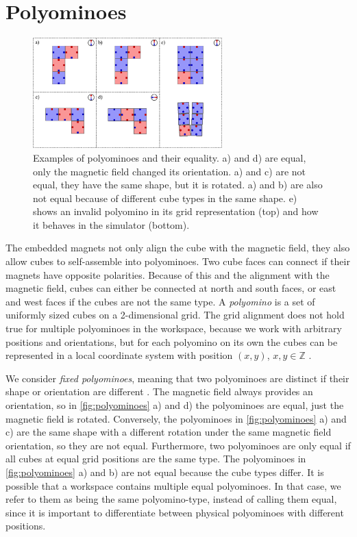 \section{Polyominoes}
\label{sec:polys}

\begin{figure}
	\centering
	\includegraphics[width=0.65\textwidth]{figures/polyominoes.pdf}
	\caption[Examples of polyominoes and their equality]{Examples of polyominoes and their equality. a) and d) are equal, only the magnetic field changed its orientation. a) and c) are not equal, they have the same shape, but it is rotated. a) and b) are also not equal because of different cube types in the same shape. e) shows an invalid polyomino in its grid representation (top) and how it behaves in the simulator (bottom).}
	\label{fig:polyominoes}
\end{figure}

The embedded magnets not only align the cube with the magnetic field, they also allow cubes to self-assemble into polyominoes.
Two cube faces can connect if their magnets have opposite polarities.
Because of this and the alignment with the magnetic field, cubes can either be connected at north and south faces, or east and west faces if the cubes are not the same type.
A \textit{polyomino} is a set of uniformly sized cubes on a 2-dimensional grid.
The grid alignment does not hold true for multiple polyominoes in the workspace, because we work with arbitrary positions and orientations, but for each polyomino on its own the cubes can be represented in a local coordinate system with position $(x,y)$, $x,y \in \mathbb{Z}$ \cite{Lu2021}.

We consider \textit{fixed polyominoes}, meaning that two polyominoes are distinct if their shape or orientation are different \cite{Lu2021}.
The magnetic field always provides an orientation, so in \autoref{fig:polyominoes} a) and d) the polyominoes are equal, just the magnetic field is rotated.
Conversely, the polyominoes in \autoref{fig:polyominoes} a) and c) are the same shape with a different rotation under the same magnetic field orientation, so they are not equal.
Furthermore, two polyominoes are only equal if all cubes at equal grid positions are the same type.
The polyominoes in \autoref{fig:polyominoes} a) and b) are not equal because the cube types differ.
It is possible that a workspace contains multiple equal polyominoes.
In that case, we refer to them as being the same polyomino-type, instead of calling them equal, since it is important to differentiate between physical polyominoes with different positions.

